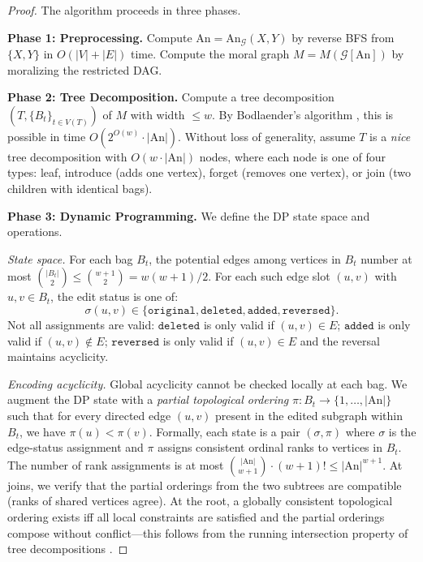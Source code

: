 \documentclass[11pt,a4paper]{article}
\theoremstyle{definition}
\theoremstyle{remark}
\newcommand{\DAG}{\mathcal{G}}
\newcommand{\An}{\mathrm{An}}
\begin{document}
\begin{proof}
The algorithm proceeds in three phases.

\medskip
\noindent\textbf{Phase 1: Preprocessing.}
Compute $\An = \An_\DAG(X,Y)$ by reverse BFS from $\{X, Y\}$ in $O(|V| + |E|)$ time.
Compute the moral graph $M = M(\DAG[\An])$ by moralizing the restricted DAG.

\medskip
\noindent\textbf{Phase 2: Tree Decomposition.}
Compute a tree decomposition $(T, \{B_t\}_{t \in V(T)})$ of $M$ with width $\leq w$.
By Bodlaender's algorithm \cite{bodlaender1996}, this is possible in time
$O(2^{O(w)} \cdot |\An|)$. Without loss of generality, assume $T$ is a \emph{nice}
tree decomposition with $O(w \cdot |\An|)$ nodes, where each node is one of four types:
leaf, introduce (adds one vertex), forget (removes one vertex), or join (two children
with identical bags).

\medskip
\noindent\textbf{Phase 3: Dynamic Programming.}
We define the DP state space and operations.

\textit{State space.} For each bag $B_t$, the potential edges among vertices in $B_t$
number at most $\binom{|B_t|}{2} \leq \binom{w+1}{2} = w(w+1)/2$. For each such edge
slot $(u,v)$ with $u, v \in B_t$, the edit status is one of:
\[
  \sigma(u,v) \in \{\texttt{original}, \texttt{deleted}, \texttt{added}, \texttt{reversed}\}.
\]
Not all assignments are valid: $\texttt{deleted}$ is only valid if $(u,v) \in E$;
$\texttt{added}$ is only valid if $(u,v) \notin E$; $\texttt{reversed}$ is only valid
if $(u,v) \in E$ and the reversal maintains acyclicity.

\textit{Encoding acyclicity.} Global acyclicity cannot be checked locally at each bag.
We augment the DP state with a \emph{partial topological ordering} $\pi: B_t \to
\{1, \ldots, |\An|\}$ such that for every directed edge $(u, v)$ present in the edited
subgraph within $B_t$, we have $\pi(u) < \pi(v)$. Formally, each state is a pair
$(\sigma, \pi)$ where $\sigma$ is the edge-status assignment and $\pi$ assigns
consistent ordinal ranks to vertices in $B_t$. The number of rank assignments is at most
$\binom{|\An|}{w+1} \cdot (w+1)! \leq |\An|^{w+1}$. At joins, we verify that the
partial orderings from the two subtrees are compatible (ranks of shared vertices agree).
At the root, a globally consistent topological ordering exists iff all local constraints
are satisfied and the partial orderings compose without conflict---this follows from the
running intersection property of tree decompositions \cite{bodlaender1996}.


\end{proof}
\end{document}
